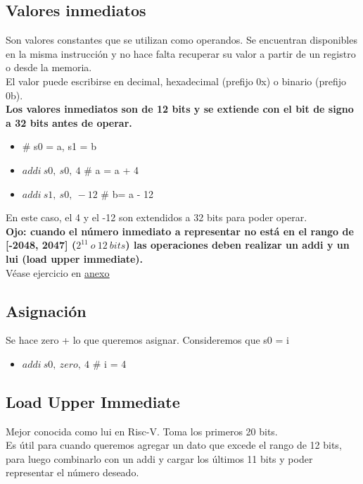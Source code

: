 \documentclass[10pt,a4paper]{article}
\begin{document}
\subsection*{Valores inmediatos}
Son valores constantes que se utilizan como operandos. Se encuentran disponibles en la misma instrucción y no hace falta recuperar su valor a partir de un registro o desde la memoria. \\
El valor puede escribirse en decimal, hexadecimal (prefijo 0x) o binario (prefijo 0b). \\
\textbf{Los valores inmediatos son de 12 bits y se extiende con el bit de signo a 32 bits antes de operar.}
\begin{itemize}
    \item \# s0 = a, s1 = b
    \item \(addi \ s0,\ s0,\ 4\) \# a = a + 4
    \item \(addi \ s1,\ s0, \ -12\) \# b= a - 12
\end{itemize}
En este caso, el 4 y el -12 son extendidos a 32 bits para poder operar. \\ 
\textbf{Ojo: cuando el número inmediato a representar no está en el rango de [-2048, 2047] ($2^{11} \ o \ 12 \ bits$) las operaciones deben realizar un addi y un lui (load upper immediate).} \\
Véase ejercicio en \hyperref[subsec:TPRVC]{\underline{anexo}}

\subsection*{Asignación}
Se hace zero + lo que queremos asignar. Consideremos que s0 = i
\begin{itemize}
    \item \(addi \ s0,\ zero,\ 4\) \# i = 4
\end{itemize}
\subsection*{Load Upper Immediate}
Mejor conocida como lui en Risc-V. Toma los primeros 20 bits. \\ 
Es útil para cuando queremos agregar un dato que excede el rango de 12 bits, para luego combinarlo con un addi y cargar los últimos 11 bits y poder representar el número deseado.
\end{document}
